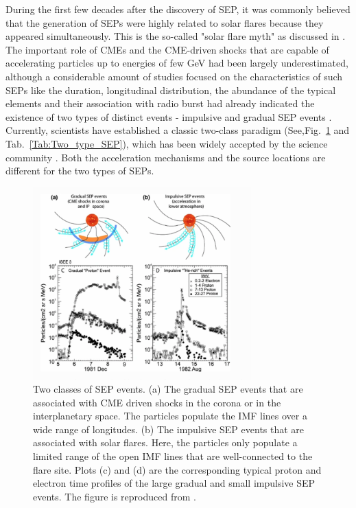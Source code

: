 During the first few decades after the discovery of \ac{SEP}, it was commonly believed that the generation of \acp{SEP} were highly related to solar flares because they appeared simultaneously. This is the so-called "solar flare myth" as discussed in \citet{gosling1993the}. The important role of \acp{CME} and the \ac{CME}-driven shocks that are capable of accelerating particles up to energies of few GeV had been largely underestimated,
 although a considerable amount of studies focused on the characteristics of such \acp{SEP} like the duration, longitudinal distribution, the abundance of the typical elements and their association with radio burst had already indicated the existence of two types of distinct events - impulsive and gradual \ac{SEP} events \citep{kahler1978prompt,kahler1984associations,cliver1982injection,cane1986two, reames1988ApJ}.
Currently, scientists have established a classic two-class paradigm (See,Fig.~\ref{Fig:two_type_SEP} and Tab.~\ref{Tab:Two_type_SEP}), which has been widely accepted by the science community \citep{kallenrode2003current, Reames2013,Desai_Diacalone2016LRSP, Reames2021LNP}. Both the acceleration mechanisms and the source locations are different for the two types of \acp{SEP}.
\begin{figure}[!htb]
    \centering
    \includegraphics[width = 0.75\textwidth]{images/SEP_two_type.png}
    \caption[Two types of Solar energetic particle (SEP) event]{Two classes of \ac{SEP} events. (a) The gradual \ac{SEP} events that are associated with \ac{CME} driven shocks in the corona or in the interplanetary space. The particles populate the \ac{IMF} lines over a wide range of longitudes. (b) The impulsive \ac{SEP} events that are associated with solar flares. Here, the particles only populate a limited range of the open \ac{IMF} lines that are well-connected to the flare site. Plots (c) and (d) are the corresponding typical proton and electron time profiles of the large gradual and small impulsive SEP events. The figure is reproduced from \citet{Desai_Diacalone2016LRSP}.}
    \label{Fig:two_type_SEP}
\end{figure}

